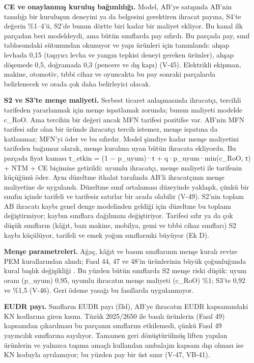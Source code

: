 \textbf{CE ve onaylanmış kuruluş bağımlılığı.} Model, AB'ye satışında AB'nin tanıdığı bir kuruluşun deneyini ya da belgesini gerektiren ihracat payına, S4'te değerin \%1--4'ü, S2'de bunun dörtte biri kadar bir maliyet ekliyor. Bu kanal ilk parçadan beri modeldeydi, ama bütün sınıflarda pay sıfırdı. Bu parçada pay, sınıf tablosundaki  sütunundan okunuyor ve yapı ürünleri için tanımlandı: ahşap levhada 0,15 (taşıyıcı levha ve yangın tepkisi deneyi gereken ürünler), ahşap döşemede 0,5, doğramada 0,3 (pencere ve dış kapı) (V-45). Elektrikli ekipman, makine, otomotiv, tıbbi cihaz ve oyuncakta bu pay sonraki parçalarda belirlenecek ve orada çok daha belirleyici olacak.

\textbf{S2 ve S3'te menşe maliyeti.} Serbest ticaret anlaşmasında ihracatçı, tercihli tarifeden yararlanmak için menşe ispatlamak zorunda; bunun maliyeti modelde c\_RoO. Ama tercihin bir değeri ancak MFN tarifesi pozitifse var. AB'nin MFN tarifesi sıfır olan bir üründe ihracatçı tercih istemez, menşe ispatına da katlanmaz; MFN'yi öder ve bu sıfırdır. Model şimdiye kadar menşe maliyetini tarifeden bağımsız olarak, menşe kuralına uyan bütün ihracata ekliyordu. Bu parçada fiyat kaması τ\_etkin = (1 − p\_uyum)·τ + q·p\_uyum·min(c\_RoO, τ) + NTM + CE biçimine getirildi: uyumlu ihracatçı, menşe maliyeti ile tarifenin küçüğünü öder. Aynı düzeltme ithalat tarafında AB'li ihracatçının menşe maliyetine de uygulandı. Düzeltme sınıf ortalaması düzeyinde yaklaşık, çünkü bir sınıfın içinde tarifeli ve tarifesiz satırlar bir arada olabilir (V-49). S2'nin toplam AB ihracatı kaybı genel denge modelinden geldiği için düzeltme bu toplamı değiştirmiyor; kaybın sınıflara dağılımını değiştiriyor. Tarifesi sıfır ya da çok düşük sınıfların (kâğıt, bazı makine, mobilya, gemi ve tıbbi cihaz sınıfları) S2 kaybı küçülüyor, tarifeli ve emek yoğun sınıflarınki büyüyor (Ek D).

\textbf{Menşe parametreleri.} Ağaç, kâğıt ve basım sınıflarının menşe kuralı revize PEM kurallarından alındı; Fasıl 44, 47 ve 48'in ürünlerinin büyük çoğunluğunda kural başlık değişikliği \etiketV{}. Bu yüzden bütün sınıflarda S2 menşe riski düşük: uyum oranı (p\_uyum) 0,95, uyumlu ihracatın menşe maliyeti (c\_RoO) \%1; S3'te 0,92 ve \%1,5 (V-46). Geri ödeme yasağı bu fasıllarda uygulanmıyor.

\textbf{EUDR payı.} Sınıfların EUDR payı (f3d), AB'ye ihracatın EUDR kapsamındaki KN kodlarına giren kısmı. Tüzük 2025/2650 ile basılı ürünlerin (Fasıl 49) kapsamdan çıkarılması bu parçanın sınıflarını etkilemedi, çünkü Fasıl 49 yayıncılık sınıflarına sayılıyor. Tamamen geri dönüştürülmüş liften yapılan ürünlerin ve yalnızca taşıma amaçlı kullanılan ambalajın kapsam dışı olması ise KN koduyla ayrılamıyor; bu yüzden pay bir üst sınır (V-47, VB-41).

